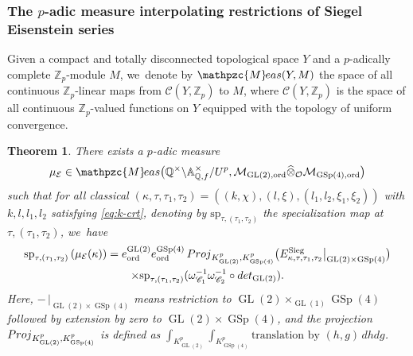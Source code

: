 \documentclass[10pt]{amsart}
\theoremstyle{plain}
\newtheorem{thm}{Theorem}[subsection]
\theoremstyle{remark}
\let\mr\mathrm
\newcommand{\bA}{\mathbb{A}}
\newcommand{\bQ}{\mathbb{Q}}
\newcommand{\bZ}{\mathbb{Z}}
\newcommand{\cE}{\mathcal{E}}
\newcommand{\cM}{\mathcal{M}}
\newcommand{\cO}{\mathcal{O}}
\newcommand{\sC}{\mathscr{C}}
\DeclareMathOperator{\GL}{GL}
\DeclareMathOperator{\GSp}{GSp}
\newcommand{\Meas}{\mathpzc{M}\mkern-2mu eas}
\newcommand{\ord}{\mathrm{ord}}
\newcommand{\Sieg}{\mr{Sieg}}
\newcommand{\spe}{\mathrm{sp}}
\let\wh\widehat
\begin{document}
\subsubsection{The \texorpdfstring{$p$}{p}-adic measure interpolating restrictions of Siegel Eisenstein series}
Given a compact and totally disconnected topological space $Y$ and a $p$-adically complete $\bZ_p$-module $M$, we~denote by $\Meas(Y,M)$ the space of all continuous $\bZ_p$-linear maps from $\sC(Y,\bZ_p)$ to $M$, where $\sC(Y,\bZ_p)$ is the space of all continuous $\bZ_p$-valued functions on $Y$ equipped with the topology of uniform convergence.
\begin{thm}\label{thm:EisF}
There exists a $p$-adic measure
\[
\mu_\cE\in\Meas\bigl(\bQ^\times\backslash\bA^\times_{\bQ,f}/U^p,\cM_{\GL(2),\ord}\wh{\otimes}_{\cO} \cM_{\GSp(4),\ord} \bigr)
\]
such that for all classical $(\kappa,\tau,\tau_1,\tau_2)=((k,\chi),(l,\xi),(l_1,l_2,\xi_1,\xi_2))$ with $k,l,l_1,l_2$ satisfying \eqref{eq:k-crt}, denoting by $\spe_{\tau,(\tau_1,\tau_2)}$ the specialization map at $\tau,(\tau_1,\tau_2)$, we~have
\begin{multline*}
\spe_{\tau,(\tau_1,\tau_2)}\left(\mu_\cE(\kappa)\right)
=e^{\GL(2)}_\ord e^{\GSp(4)}_\ord \,{\rm Proj}_{K^p_{\GL(2)},K^p_{\GSp(4)}} \bigl(E^\Sieg_{\kappa,\tau,\tau_1,\tau_2}\big|_{\GL(2)\times\GSp(4)} \bigr)\\
\times \spe_{\tau,(\tau_1,\tau_2)}(\omega^{-1}_{\sC_1}\omega^{-1}_{\sC_2}\circ{\rm det}_{\GL(2)}).
\end{multline*}
Here, $-\,|_{\GL(2)\times\GSp(4)}$ means restriction to $\GL(2)\times_{\GL(1)}\GSp(4)$ followed by extension by zero to $\GL(2)\times\GSp(4)$, and the projection ${\rm Proj}_{K^p_{\GL(2)},K^p_{\GSp(4)}}$ is defined as $\int_{K^p_{\GL(2)}}\int_{K^p_{\GSp(4)}} \text{translation by }(h,g)\,dh dg$.
\end{thm}
\end{document}
